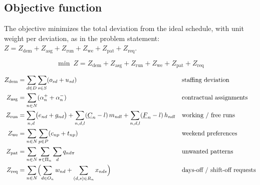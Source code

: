 \documentclass[11pt,a4paper]{article}
\newcommand{\Cmin}{\underline{C}}   \newcommand{\Cmax}{\overline{C}}
\newcommand{\Fmin}{\underline{F}}   \newcommand{\Fmax}{\overline{F}}
\begin{document}
\subsection{Objective function}

The objective minimizes the total deviation from the ideal schedule, with unit weight per deviation, as in the problem statement: $Z=Z_{\mathrm{dem}}+Z_{\mathrm{asg}}+Z_{\mathrm{run}}+Z_{\mathrm{we}}+Z_{\mathrm{pat}}+Z_{\mathrm{req}}$.

\begin{equation}\tag{OBJ}
\min\ Z=Z_{\mathrm{dem}}+Z_{\mathrm{asg}}+Z_{\mathrm{run}}+Z_{\mathrm{we}}+Z_{\mathrm{pat}}+Z_{\mathrm{req}}
\end{equation}

\begin{align*}
Z_{\mathrm{dem}} &= \sum_{d\in D}\sum_{s\in S}(o_{sd}+u_{sd})
&&\text{staffing deviation}\\
Z_{\mathrm{asg}} &= \sum_{n\in N}(\alpha^+_n+\alpha^-_n)
&&\text{contractual assignments}\\
Z_{\mathrm{run}} &= \sum_{n,d}\bigl(e_{nd}+g_{nd}\bigr)
 +\sum_{n,d,l}(\Cmin_n-l)\,m_{ndl}
 +\sum_{n,d,l}(\Fmin_n-l)\,h_{ndl}
&&\text{working / free runs}\\
Z_{\mathrm{we}} &= \sum_{n\in N}\sum_{p\in P}(c_{np}+t_{np})
&&\text{weekend preferences}\\
Z_{\mathrm{pat}} &= \sum_{n\in N}\sum_{\pi\in\Pi_n}\sum_{d}q_{nd\pi}
&&\text{unwanted patterns}\\
Z_{\mathrm{req}} &= \sum_{n\in N}\Bigl(\sum_{d\in O_n} w_{nd}+\sum_{(d,s)\in R_n} x_{nds}\Bigr)
&&\text{days-off / shift-off requests}
\end{align*}
\end{document}
